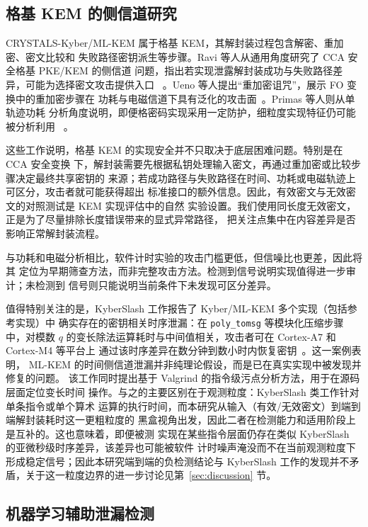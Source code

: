 \documentclass[a4paper,fontset=none]{ctexart}
\begin{document}
\subsection{格基 KEM 的侧信道研究}

CRYSTALS-Kyber/ML-KEM 属于格基 KEM，其解封装过程包含解密、重加密、密文比较和
失败路径密钥派生等步骤。Ravi 等人从通用角度研究了 CCA 安全格基 PKE/KEM 的侧信道
问题，指出若实现泄露解封装成功与失败路径差异，可能为选择密文攻击提供入口
~\cite{Ravi2020}。Ueno 等人提出``重加密诅咒''，展示 FO 变换中的重加密步骤在
功耗与电磁信道下具有泛化的攻击面~\cite{Ueno2022}。Primas 等人则从单轨迹功耗
分析角度说明，即便格密码实现采用一定防护，细粒度实现特征仍可能被分析利用
~\cite{Primas2017}。

这些工作说明，格基 KEM 的实现安全并不只取决于底层困难问题。特别是在 CCA 安全变换
下，解封装需要先根据私钥处理输入密文，再通过重加密或比较步骤决定最终共享密钥的
来源；若成功路径与失败路径在时间、功耗或电磁轨迹上可区分，攻击者就可能获得超出
标准接口的额外信息。因此，有效密文与无效密文的对照测试是 KEM 实现评估中的自然
实验设置。我们使用同长度无效密文，正是为了尽量排除长度错误带来的显式异常路径，
把关注点集中在内容差异是否影响正常解封装流程。

与功耗和电磁分析相比，软件计时实验的攻击门槛更低，但信噪比也更差，因此将其
定位为早期筛查方法，而非完整攻击方法。检测到信号说明实现值得进一步审计；未检测到
信号则只能说明当前条件下未发现可区分差异。

值得特别关注的是，KyberSlash 工作报告了 Kyber/ML-KEM 多个实现（包括参考实现）中
确实存在的密钥相关时序泄漏：在 \texttt{poly\_tomsg} 等模块化压缩步骤中，对模数
$q$ 的变长除法运算耗时与中间值相关，攻击者可在 Cortex-A7 和 Cortex-M4 等平台上
通过该时序差异在数分钟到数小时内恢复密钥~\cite{Bernstein2025}。这一案例表明，
ML-KEM 的时间侧信道泄漏并非纯理论假设，而是已在真实实现中被发现并修复的问题。
该工作同时提出基于 Valgrind 的指令级污点分析方法，用于在源码层面定位变长时间
操作。与之的主要区别在于观测粒度：KyberSlash 类工作针对单条指令或单个算术
运算的执行时间，而本研究从输入（有效/无效密文）到端到端解封装耗时这一更粗粒度的
黑盒视角出发，因此二者在检测能力和适用阶段上是互补的。这也意味着，即便被测
实现在某些指令层面仍存在类似 KyberSlash 的亚微秒级时序差异，该差异也可能被软件
计时噪声淹没而不在当前观测粒度下形成稳定信号；因此本研究端到端的负检测结论与
KyberSlash 工作的发现并不矛盾，关于这一粒度边界的进一步讨论见第~\ref{sec:discussion}
节。

\subsection{机器学习辅助泄漏检测}
\end{document}
